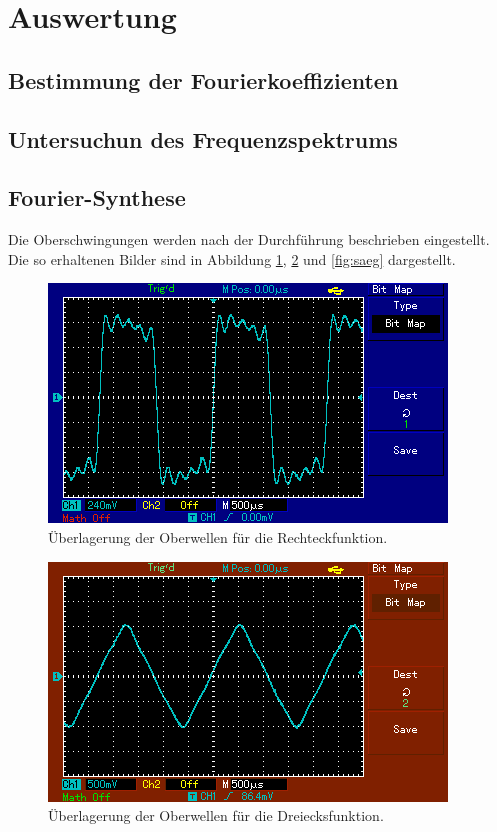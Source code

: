 \section{Auswertung}
\label{sec:Auswertung}
\subsection{Bestimmung der Fourierkoeffizienten}

\subsection{Untersuchun des Frequenzspektrums}

\subsection{Fourier-Synthese}
Die Oberschwingungen werden nach der Durchführung beschrieben eingestellt.
Die so erhaltenen Bilder sind in Abbildung \ref{fig:eck}, \ref{fig:drei} und \ref{fig:saeg} dargestellt.
\begin{figure}[H]
    \centering
    \caption{Überlagerung der Oberwellen für die Rechteckfunktion.}
    \label{fig:eck}
    \includegraphics{content/MAP001.png}
\end{figure}
\begin{figure}[H]
    \centering
    \caption{Überlagerung der Oberwellen für die Dreiecksfunktion.}
    \label{fig:drei}
    \includegraphics{content/MAP002.png}
\end{figure}
